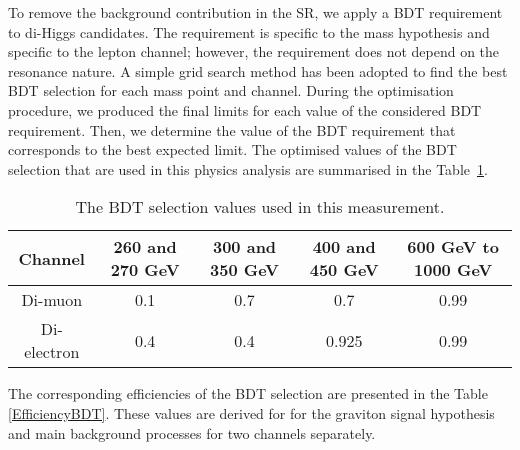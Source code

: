 To remove the background contribution in the SR, we apply a BDT requirement to di-Higgs candidates.  The requirement is specific to the mass hypothesis and specific to the lepton channel; however, the requirement does not depend on the resonance nature. A simple grid search method has been adopted to find the best BDT selection for each mass point and channel. During the optimisation procedure, we produced the final limits for each value of the considered BDT requirement. Then, we determine the value of the BDT requirement that corresponds to the best expected limit. The optimised values of the BDT selection that are used in this physics analysis are summarised in the Table~\ref{suboptCut}.

\begin{table}
\begin{center} 
  \caption{The BDT selection values used in this measurement.}
 \begin{tabular}{ |c|c|c|c|c| } \hline%
   Channel & 260 and 270 GeV & 300 and 350 GeV & 400 and 450 GeV & 600 GeV to 1000 GeV \\ \hline
   Di-muon & 0.1 & 0.7 & 0.7 & 0.99 \\ %
   Di-electron & 0.4 & 0.4 & 0.925 & 0.99\\ \hline%
  \end{tabular}
  \label{suboptCut}
\end{center}   
\end{table}

The corresponding efficiencies of the BDT selection are presented in the Table \ref{EfficiencyBDT}. These values are derived for for the graviton signal hypothesis and main background processes for two channels separately. 

